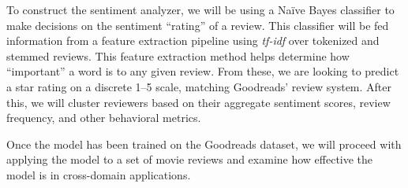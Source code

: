 To construct the sentiment analyzer, we will be using a Na\"ive Bayes classifier to make decisions on the sentiment ``rating'' of a review. This classifier will be fed information
from a feature extraction pipeline using \textit{tf-idf} over tokenized and stemmed
reviews. This feature extraction method helps determine how ``important'' a word is to any given 
review. From these, we are looking to predict a star rating on a discrete 1--5 scale, matching
Goodreads’ review system. After this, we will cluster reviewers based on their aggregate sentiment 
scores, review frequency, and other behavioral metrics.

Once the model has been trained on the Goodreads dataset, we will proceed with applying
the model to a set of movie reviews and examine how effective the model is in
cross-domain applications.
